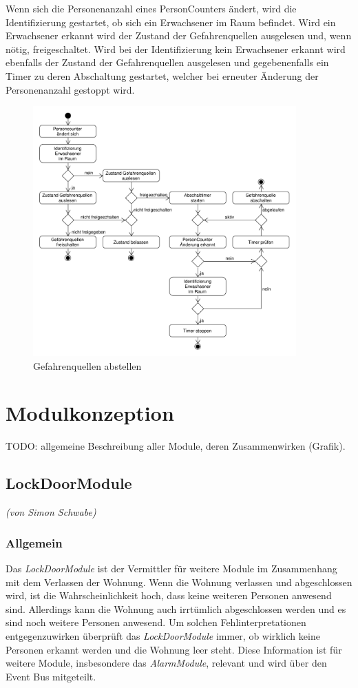 Wenn sich die Personenanzahl eines PersonCounters ändert, wird die Identifizierung gestartet, ob sich ein Erwachsener im Raum befindet. Wird ein Erwachsener erkannt wird der Zustand der Gefahrenquellen ausgelesen und, wenn nötig, freigeschaltet. Wird bei der Identifizierung kein Erwachsener erkannt wird ebenfalls der Zustand der Gefahrenquellen ausgelesen und gegebenenfalls ein Timer zu deren Abschaltung gestartet, welcher bei erneuter Änderung der Personenanzahl gestoppt wird.

\begin{figure}[h!]
	\centering
	\includegraphics[width=0.9\textwidth]{img/Szenarien/GefahrenquellenAbstellen.pdf}
	\caption{Gefahrenquellen abstellen}
	\label{fig:szenarienGefahrenquellenAbstellen}
\end{figure}


\section{Modulkonzeption}
\label{sec:modulkonzepte}
TODO: allgemeine Beschreibung aller Module, deren Zusammenwirken (Grafik).

\subsection{LockDoorModule}
\emph{(von Simon Schwabe)}

\subsubsection{Allgemein}
Das \emph{LockDoorModule} ist der Vermittler für weitere Module im Zusammenhang mit dem Verlassen der Wohnung. Wenn die Wohnung verlassen und abgeschlossen wird, ist die Wahrscheinlichkeit hoch, dass keine weiteren Personen anwesend sind. Allerdings kann die Wohnung auch irrtümlich abgeschlossen werden und es sind noch weitere Personen anwesend. Um solchen Fehlinterpretationen entgegenzuwirken überprüft das \emph{LockDoorModule} immer, ob wirklich keine Personen erkannt werden und die Wohnung leer steht. Diese Information ist für weitere Module, insbesondere das \emph{AlarmModule}, relevant und wird über den Event Bus mitgeteilt.

